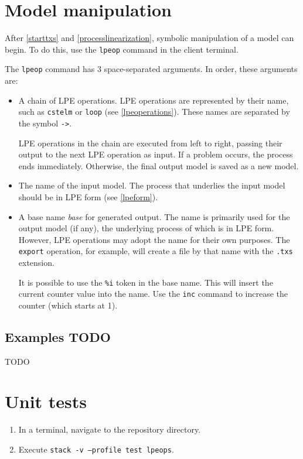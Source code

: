 \section{Model manipulation} \label{modelmanipulation}

After \ref{starttxs} and \ref{processlinearization}, symbolic manipulation of a \txs{} model can begin.
To do this, use the \texttt{lpeop} command in the client terminal.

The \texttt{lpeop} command has 3 space-separated arguments. In order, these arguments are:

\begin{itemize}
\item A chain of LPE operations.
LPE operations are represented by their name, such as \texttt{cstelm} or \texttt{loop} (see \ref{lpeoperations}).
These names are separated by the symbol \texttt{->}.

LPE operations in the chain are executed from left to right, passing their output to the next LPE operation as input.
If a problem occurs, the process ends immediately.
Otherwise, the final output model is saved as a new model.
\item The name of the input model.
The process that underlies the input model should be in LPE form (see \ref{lpeform}).
\item A base name \textit{base} for generated output.
The name is primarily used for the output model (if any), the underlying process of which is in LPE form.
However, LPE operations may adopt the name for their own purposes.
The \texttt{export} operation, for example, will create a file by that name with the \texttt{.txs} extension.

It is possible to use the \texttt{\%i} token in the base name.
This will insert the current counter value into the name.
Use the \texttt{inc} command to increase the counter (which starts at 1).
\end{itemize}

\subsection{Examples TODO}

TODO

\section{Unit tests}

\begin{enumerate}
\item In a terminal, navigate to the repository directory.
\item Execute \texttt{stack -v --profile test lpeops}.
\end{enumerate}


